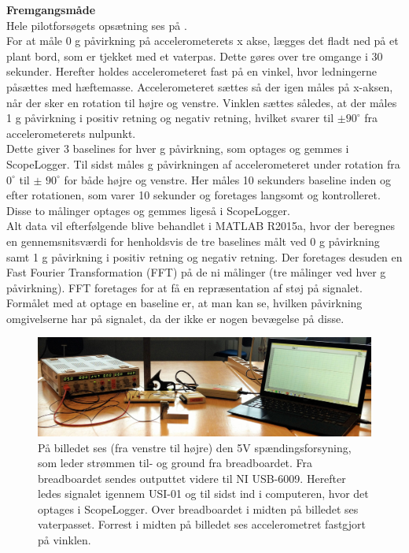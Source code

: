 \noindent\textbf{Fremgangsmåde}\\
Hele pilotforsøgets opsætning ses på . \\
For at måle 0 g påvirkning på accelerometerets x akse, lægges det fladt ned på et plant bord, som er tjekket med et vaterpas. Dette gøres over tre omgange i 30 sekunder. Herefter holdes accelerometeret fast på en vinkel, hvor ledningerne påsættes med hæftemasse. Accelerometeret sættes så der igen måles på x-aksen, når der sker en rotation til højre og venstre. Vinklen sættes således, at der måles 1 g påvirkning i positiv retning og negativ retning, hvilket svarer til $\pm 90^{\circ}$ fra accelerometerets nulpunkt. \\
Dette giver 3 baselines for hver g påvirkning, som optages og gemmes i ScopeLogger. %
Til sidst måles g påvirkningen af accelerometeret under rotation fra $0^{\circ}$ til $\pm$ $90^{\circ}$ for både højre og venstre. Her måles 10 sekunders baseline inden og efter rotationen, som varer 10 sekunder og foretages langsomt og kontrolleret. Disse to målinger optages og gemmes ligeså i ScopeLogger. \\
Alt data vil efterfølgende blive behandlet i MATLAB R2015a, hvor der beregnes en gennemsnitsværdi for henholdsvis de tre baselines målt ved 0 g påvirkning samt 1 g påvirkning i positiv retning og negativ retning. Der foretages desuden en Fast Fourier Transformation (FFT) på de ni målinger (tre målinger ved hver g påvirkning). FFT foretages for at få en repræsentation af støj på signalet. Formålet med at optage en baseline er, at man kan se, hvilken påvirkning omgivelserne har på signalet, da der ikke er nogen bevægelse på disse.

\begin{figure}[H]
	\centering
	\includegraphics[scale=0.14]{figures/cProblemloesning/Pilotforsoeg1_2.jpg}
	\caption{På billedet ses (fra venstre til højre) den 5V spændingsforsyning, som leder strømmen til- og ground fra breadboardet. Fra breadboardet sendes outputtet videre til NI USB-6009. Herefter ledes signalet igennem USI-01 og til sidst ind i computeren, hvor det optages i ScopeLogger. Over breadboardet i midten på billedet ses vaterpasset. Forrest i midten på billedet ses accelerometret fastgjort på vinklen.}
	\label{pforsoeg2}
\end{figure}

